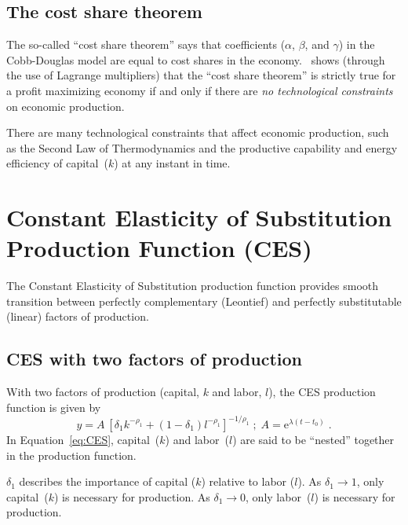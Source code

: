 \documentclass[preprint,authoryear,12pt]{elsarticle}
\begin{document}
\subsection{The cost share theorem} 
\label{sec:CD-cost-share}

The so-called ``cost share theorem'' says that coefficients ($\alpha$, $\beta$, and $\gamma$) 
in the Cobb-Douglas model are equal to cost shares in the economy.~\citep[p.~150]{Kummel:2010vz}
\citet[Eqn.~12]{Kummel:2010vz} shows (through the use of Lagrange multipliers) 
that the ``cost share theorem'' is strictly true for a profit maximizing economy
if and only if there are \emph{no technological constraints} on economic production.

There are many technological constraints that affect economic production, such as
the Second Law of Thermodynamics and
the productive capability and energy efficiency 
of capital~($k$) at any instant in time.


\section{Constant Elasticity of Substitution Production Function (CES)} 
\label{sec:CES}

The Constant Elasticity of Substitution production function
provides smooth transition between perfectly complementary (Leontief) 
and perfectly substitutable (linear) factors of production.


\subsection{CES with two factors of production} 
\label{sec:CES-2}

With two factors of production (capital, $k$ and labor, $l$), 
the CES production function is given by
%
\begin{equation} \label{eq:CES}
  y = A \: \left[\delta_1 k^{-\rho_1} 
      + (1-\delta_1)l^{-\rho_1} \right]^{-1/\rho_1} \; ; \;
      A = \mathrm{e}^{\lambda (t-t_0)}   \; .
\end{equation}
%
In Equation~\ref{eq:CES}, capital~($k$) and labor~($l$) are said to be ``nested''
together in the production function.

$\delta_1$ describes the importance of capital ($k$)
relative to labor ($l$).
As $\delta_1 \rightarrow 1$, only capital~($k$) is necessary for production.
As $\delta_1 \rightarrow 0$, only labor~($l$) is necessary for production.
\end{document}
